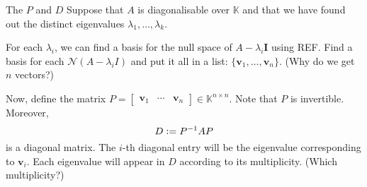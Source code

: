 \documentclass[dvipsnames]{beamer}
\theoremstyle{definition}
\begin{document}
\begin{frame}{The \texorpdfstring{$P$}{P} and \texorpdfstring{$D$}{D}}
    Suppose that $A$ is diagonalisable over $\mathbb{K}$ and that we have found out the distinct eigenvalues $\lambda_{1}, \ldots, \lambda_{k}$. \pause

    For each $\lambda_{i}$, we can find a basis for the null space of $A - \lambda_{i} \mathbf{I}$ using REF. \pause Find a basis for each $\mathcal{N}(A - \lambda_{i} I)$ and put it all in a list: $\{\mathbf{v}_{1}, \ldots, \mathbf{v}_{n}\}$. \pause (Why do we get $n$ vectors?) \pause

    Now, define the matrix $P = \begin{bmatrix}
        \mathbf{v}_{1} & \cdots & \mathbf{v}_{n}
    \end{bmatrix} \in \mathbb{K}^{n \times n}$. \pause Note that $P$ is invertible. \pause Moreover,
    \begin{equation*} 
        D \vcentcolon= P^{-1} A P
    \end{equation*}
    is a diagonal matrix. \pause The $i$-th diagonal entry will be the eigenvalue corresponding to $\mathbf{v}_{i}$. \pause Each eigenvalue will appear in $D$ according to its multiplicity. \pause (Which multiplicity?)
\end{frame}
\end{document}
